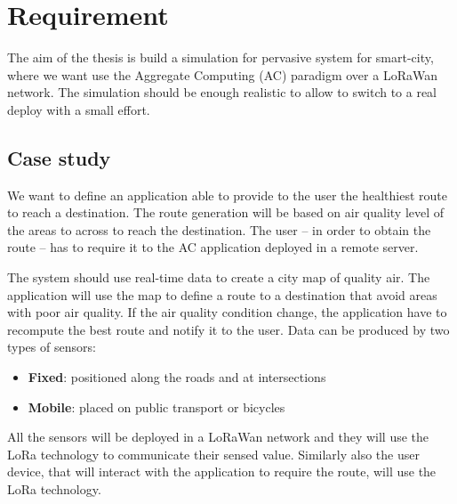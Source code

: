 \chapter{Requirement}
The aim of the thesis is build a simulation for pervasive system for smart-city, where we want use the Aggregate Computing (AC) paradigm over a LoRaWan network. The simulation should be enough realistic to allow to switch to a real deploy with a small effort.

\section{Case study}

We want to define an application able to provide to the user the healthiest route to reach a destination. The route generation will be based on air quality level of the areas to across to reach the destination. The user -- in order to obtain the route -- has to require it to the AC application deployed in a remote server.

The system should use real-time data to create a city map of quality air.
The application will use the map to define a route to a destination that avoid areas with poor air quality.
If the air quality condition change, the application have to recompute the best route and notify it to the user. 
Data can be produced by two types of sensors:
\begin{itemize}
    \item \textbf{Fixed}: positioned along the roads and at intersections
    \item \textbf{Mobile}: placed on public transport or bicycles
\end{itemize}

All the sensors will be deployed in a LoRaWan network and they will use the LoRa technology to communicate their sensed value. Similarly also the user device, that will interact with the application to require the route, will use the LoRa technology.